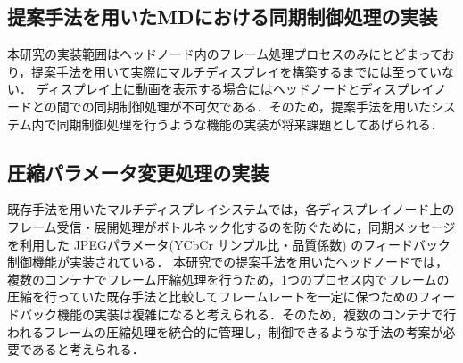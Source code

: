 \clearpage

\subsection*{提案手法を用いたMDにおける同期制御処理の実装}
本研究の実装範囲はヘッドノード内のフレーム処理プロセスのみにとどまっており，提案手法を用いて実際にマルチディスプレイを構築するまでには至っていない．
ディスプレイ上に動画を表示する場合にはヘッドノードとディスプレイノードとの間での同期制御処理が不可欠である．そのため，提案手法を用いたシステム内で同期制御処理を行うような機能の実装が将来課題としてあげられる．

\subsection*{圧縮パラメータ変更処理の実装}
既存手法を用いたマルチディスプレイシステムでは，各ディスプレイノード上のフレーム受信・展開処理がボトルネック化するのを防ぐために，同期メッセージを利用した
JPEGパラメータ(YCbCr サンプル比・品質係数) のフィードバック制御機能が実装されている．
本研究での提案手法を用いたヘッドノードでは，複数のコンテナでフレーム圧縮処理を行うため，1つのプロセス内でフレームの圧縮を行っていた既存手法と比較してフレームレートを一定に保つためのフィードバック機能の実装は複雑になると考えられる．そのため，複数のコンテナで行われるフレームの圧縮処理を統合的に管理し，制御できるような手法の考案が必要であると考えられる．